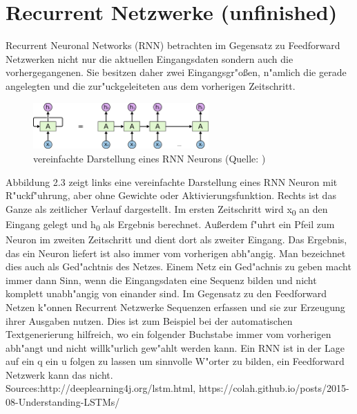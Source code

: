 {\section{Recurrent Netzwerke (unfinished)}
Recurrent Neuronal Networks (RNN) betrachten im Gegensatz zu Feedforward Netzwerken nicht nur die aktuellen Eingangsdaten sondern auch die vorhergegangenen. Sie besitzen daher zwei Eingangsgr"o{\ss}en, n"amlich die gerade angelegten und die zur"uckgeleiteten aus dem vorherigen Zeitschritt.
\renewcommand{\figurename}{Abb.}
\begin{figure}[htp]
\centering
\includegraphics[width=0.60\textwidth]{pictures/RNN-unrolled.png}
\caption[RNN Neuron]{vereinfachte Darstellung eines RNN Neurons (Quelle: \cite{OlahImg})}
\end{figure}
Abbildung 2.3 zeigt links eine vereinfachte Darstellung eines RNN Neuron mit R"uckf"uhrung, aber ohne Gewichte oder Aktivierungsfunktion. Rechts ist das Ganze als zeitlicher Verlauf dargestellt. Im ersten Zeitschritt wird x\textsubscript{0} an den Eingang gelegt und h\textsubscript{0} als Ergebnis berechnet. Au{\ss}erdem f"uhrt ein Pfeil zum Neuron im zweiten Zeitschritt und dient dort als zweiter Eingang. Das Ergebnis, das ein Neuron liefert ist also immer vom vorherigen abh"angig. Man bezeichnet dies auch als Ged"achtnis des Netzes. Einem Netz ein Ged"achnis zu geben macht immer dann Sinn, wenn die Eingangsdaten eine Sequenz bilden und nicht komplett unabh"angig von einander sind. Im Gegensatz zu den Feedforward Netzen k"onnen Recurrent Netzwerke Sequenzen erfassen und sie zur Erzeugung ihrer Ausgaben nutzen. Dies ist zum Beispiel bei der automatischen Textgenerierung hilfreich, wo ein folgender Buchstabe immer vom vorherigen abh"angt und nicht willk"urlich gew"ahlt werden kann. Ein RNN ist in der Lage auf ein q ein u folgen zu lassen um sinnvolle W"orter zu bilden, ein Feedforward Netzwerk kann das nicht.\\
Sources:http://deeplearning4j.org/lstm.html, https://colah.github.io/posts/2015-08-Understanding-LSTMs/


}

